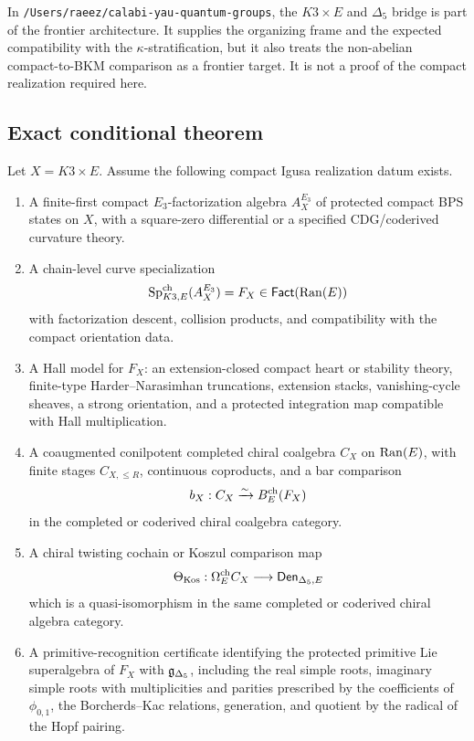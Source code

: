 In \texttt{/Users/raeez/calabi-yau-quantum-groups}, the
\(K3\times E\) and \(\Delta_5\) bridge is part of the frontier
architecture.  It supplies the organizing frame and the expected
compatibility with the \(\kappa\)-stratification, but it also treats the
non-abelian compact-to-BKM comparison as a frontier target.  It is not a
proof of the compact realization required here.

\subsection{Exact conditional theorem}

\begin{theorem}
\label{thm:agent14-conditional-compact-chiral-koszul}
Let \(X=K3\times E\).  Assume the following compact Igusa realization
datum exists.
\begin{enumerate}
\item A finite-first compact \(E_3\)-factorization algebra
\(A_X^{E_3}\) of protected compact BPS states on \(X\), with a
square-zero differential or a specified CDG/coderived curvature theory.

\item A chain-level curve specialization
\[
        \mathrm{Sp}^{\mathrm{ch}}_{K3,E}(A_X^{E_3})=F_X\in\mathsf{Fact}(\operatorname{Ran}(E))
\]
with factorization descent, collision products, and compatibility with
the compact orientation data.

\item A Hall model for \(F_X\): an extension-closed compact heart or
stability theory, finite-type Harder--Narasimhan truncations, extension
stacks, vanishing-cycle sheaves, a strong orientation, and a protected
integration map compatible with Hall multiplication.

\item A coaugmented conilpotent completed chiral coalgebra \(C_X\) on
\(\operatorname{Ran}(E)\), with finite stages \(C_{X,\le R}\), continuous coproducts,
and a bar comparison
\[
        b_X:C_X\xrightarrow{\sim}B^{\mathrm{ch}}_E(F_X)
\]
in the completed or coderived chiral coalgebra category.

\item A chiral twisting cochain or Koszul comparison map
\[
        \Theta_{\mathrm{Kos}}:\Omega^{\mathrm{ch}}_E C_X\longrightarrow \mathsf{Den}_{\Delta_5,E}
\]
which is a quasi-isomorphism in the same completed or coderived chiral
algebra category.

\item A primitive-recognition certificate identifying the protected
primitive Lie superalgebra of \(F_X\) with \(\mathfrak g_{\Delta_5}\), including the
real simple roots, imaginary simple roots with multiplicities and
parities prescribed by the coefficients of \(\phi_{0,1}\), the
Borcherds--Kac relations, generation, and quotient by the radical of
the Hopf pairing.


\end{enumerate}
\end{theorem}
